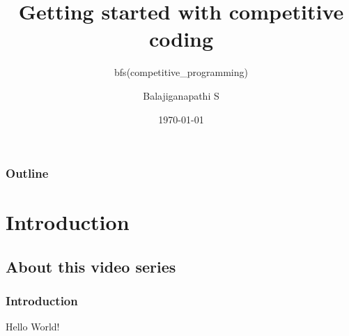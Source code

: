 \documentclass{beamer}
\title{Getting started with competitive coding}
\subtitle{bfs(competitive\_programming)}
\author{Balajiganapathi S}
\institute{code-drills.com}
\date{\today}
\begin{document}
\begin{frame}
    \titlepage{}
\end{frame}

\begin{frame}
    \frametitle{Outline}
    \tableofcontents
\end{frame}

\section{Introduction}
\subsection{About this video series}

\begin{frame}
    \frametitle{Introduction}
    Hello World!
\end{frame}
\end{document}
